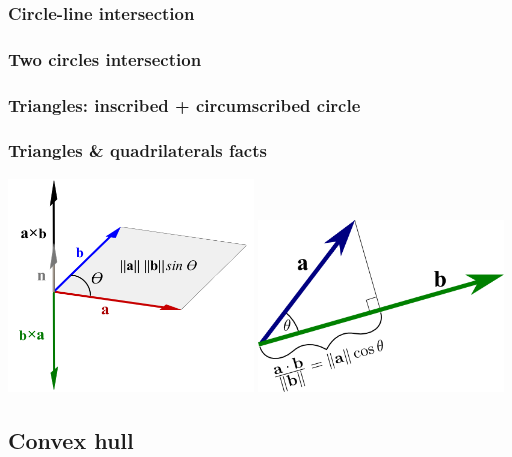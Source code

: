 \documentclass[a4paper]{article}
\begin{document}
        \subsubsection{Circle-line intersection}
            
        \subsubsection{Two circles intersection}
            
        \subsubsection{Triangles: inscribed + circumscribed circle}
            
        \subsubsection{Triangles \& quadrilaterals facts}
            
        \includegraphics[width=6.5cm]{../images/Cross-product-with-area.png}
        \includegraphics[width=6.5cm]{../images/dot_product_projection.png}
    \subsection{Convex hull}
        
\end{document}
